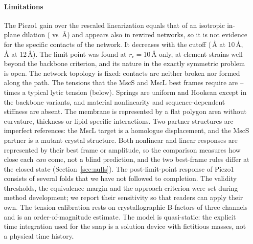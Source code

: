 \documentclass[preprint,12pt,a4paper]{elsarticle}
\begin{document}
\paragraph{Limitations} The Piezo1 gain over the rescaled linearization equals that of an isotropic in-plane dilation ( vs \,\AA) and appears also in rewired networks, so it is not evidence for the specific contacts of the network. It decreases with the cutoff (\,\AA{} at 10\,\AA, \,\AA{} at 12\,\AA). The limit point was found at $r_c=10$\,\AA{} only, at element strains well beyond the backbone criterion, and its nature in the exactly symmetric problem is open. The network topology is fixed: contacts are neither broken nor formed along the path. The tensions that the MscS and MscL best frames require are -- times a typical lytic tension (below). Springs are uniform and Hookean except in the backbone variants, and material nonlinearity and sequence-dependent stiffness are absent. The membrane is represented by a flat polygon area without curvature, thickness or lipid-specific interactions. Two partner structures are imperfect references: the MscL target is a homologue displacement, and the MscS partner is a mutant crystal structure. Both nonlinear and linear responses are represented by their best frame or amplitude, so the comparison measures how close each \emph{can} come, not a blind prediction, and the two best-frame rules differ at the closed state (Section~\ref{sec:nulls}). The post-limit-point response of Piezo1 consists of several folds that we have not followed to completion. The validity thresholds, the equivalence margin and the approach criterion were set during method development; we report their sensitivity so that readers can apply their own. The tension calibration rests on crystallographic B-factors of three channels and is an order-of-magnitude estimate. The model is quasi-static: the explicit time integration used for the snap is a solution device with fictitious masses, not a physical time history.
\end{document}
